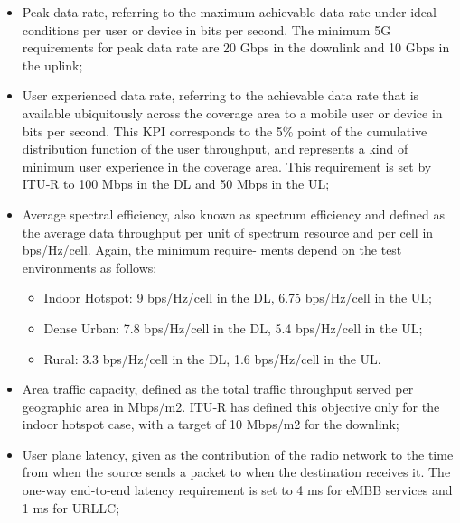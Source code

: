 \documentclass{report}
\begin{document}
\begin{itemize}
\item Peak data rate, referring to the maximum achievable data rate under ideal conditions per user or
device in bits per second. The minimum 5G requirements for peak data rate are 20 Gbps in the
downlink and 10 Gbps in the uplink;
\end{itemize}
\begin{itemize}
\item User experienced data rate, referring to the achievable data rate that is available ubiquitously
across the coverage area to a mobile user or device in bits per second. This KPI corresponds to the
5\% point of the cumulative distribution function of the user throughput, and represents
a kind of minimum user experience in the coverage area. This requirement is set by ITU‐R to
100 Mbps in the DL and 50 Mbps in the UL;
\end{itemize}
\begin{itemize}
\item Average spectral efficiency, also known as spectrum efficiency and defined as the average data
throughput per unit of spectrum resource and per cell in bps/Hz/cell. Again, the minimum require-
ments depend on the test environments as follows:
\begin{itemize}
\item Indoor Hotspot: 9 bps/Hz/cell in the DL, 6.75 bps/Hz/cell in the UL;
\end{itemize}
\begin{itemize}
\item Dense Urban: 7.8 bps/Hz/cell in the DL, 5.4 bps/Hz/cell in the UL;
\end{itemize}
\begin{itemize}
\item Rural: 3.3 bps/Hz/cell in the DL, 1.6 bps/Hz/cell in the UL.
\end{itemize}
\end{itemize}
\begin{itemize}
\item Area traffic capacity, defined as the total traffic throughput served per geographic area in Mbps/m2.
ITU‐R has defined this objective only for the indoor hotspot case, with a target of 10 Mbps/m2 for
the downlink;
\end{itemize}
\begin{itemize}
\item User plane latency, given as the contribution of the radio network to the time from when the
source sends a packet to when the destination receives it. The one‐way end‐to‐end latency
requirement is set to 4 ms for eMBB services and 1 ms for URLLC;
\end{itemize}
\end{document}
